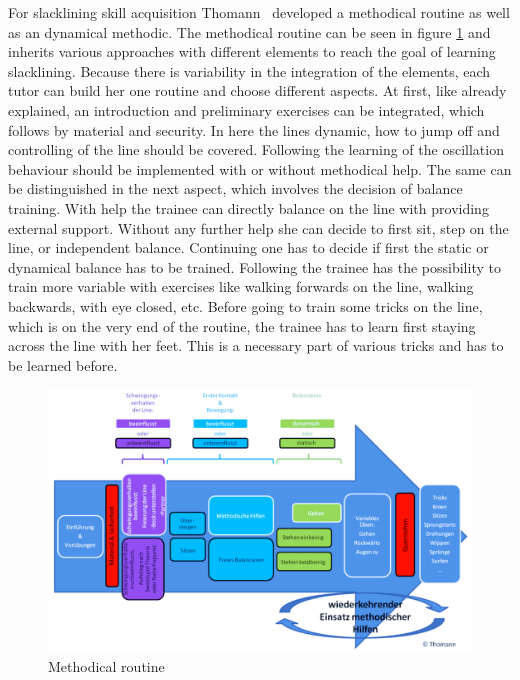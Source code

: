 For slacklining skill acquisition Thomann~\cite{Thomann2013-aa} developed a methodical routine as well as an dynamical methodic. The methodical routine can be seen in figure \ref{fig:3_3_1_methodicalRoutine} and inherits various approaches with different elements to reach the goal of learning slacklining. Because there is variability in the integration of the elements, each tutor can build her one routine and choose different aspects. At first, like already explained, an introduction and preliminary exercises can be integrated, which follows by material and security. In here the lines dynamic, how to jump off and controlling of the line should be covered. Following the learning of the oscillation behaviour should be implemented with or without methodical help. The same can be distinguished in the next aspect, which involves the decision of balance training. With help the trainee can directly balance on the line with providing external support. Without any further help she can decide to first sit, step on the line, or independent balance. Continuing one has to decide if first the static or dynamical balance has to be trained. Following the trainee has the possibility to train more variable with exercises like walking forwards on the line, walking backwards, with eye closed, etc. Before going to train some tricks on the line, which is on the very end of the routine, the trainee has to learn first staying across the line with her feet. This is a necessary part of various tricks and has to be learned before.

\begin{figure}[htb]
	\centering
	\begin{minipage}[t]{1\linewidth}
		\centering
		\includegraphics[width=1\linewidth]{Pictures/3_3_1_methodicalRoutine}
		\caption{Methodical routine~\cite{Thomann2013-aa}}
		\label{fig:3_3_1_methodicalRoutine}
	\end{minipage}
\end{figure}

